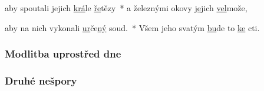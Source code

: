aby spoutali jejich \underline{krá}le \underline{ře}tězy~*
a železnými okovy \underline{je}jich \underline{vel}može,

aby na nich vykonali \underline{ur}če\underline{ný} soud.~*
Všem jeho svatým \underline{bu}de to \underline{ke} cti.


\subsubsection{Modlitba uprostřed dne}


\subsubsection{Druhé nešpory}